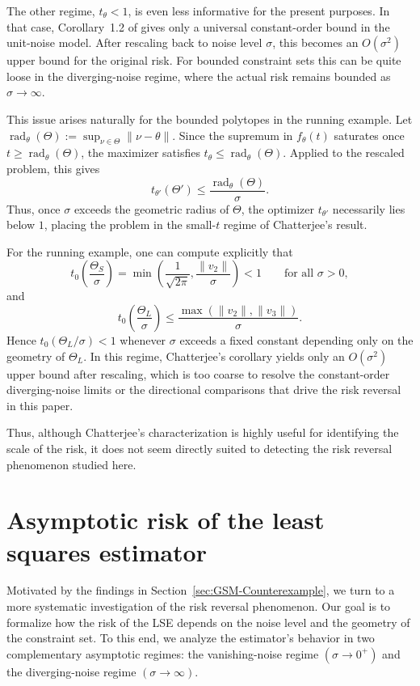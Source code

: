 \documentclass[11pt]{article}
\theoremstyle{plain}
\theoremstyle{definition}
\begin{document}
The other regime, $t_\theta<1$, is even less informative for the present purposes. In that case, Corollary~1.2 of \cite{Chatterjee14} gives only a
universal constant-order bound in the unit-noise model. After rescaling back to
noise level $\sigma$, this becomes an $O(\sigma^2)$ upper bound for the
original risk. For bounded constraint sets this can be quite loose in the
diverging-noise regime, where the actual risk remains bounded as
$\sigma\to\infty$.

This issue arises naturally for the bounded polytopes in
the running example. Let
$\operatorname{rad}_\theta(\Theta):=
\sup_{\nu\in\Theta}\|\nu-\theta\|$. Since the supremum in $f_\theta(t)$
saturates once $t\ge \operatorname{rad}_\theta(\Theta)$, the maximizer
satisfies $t_\theta\le \operatorname{rad}_\theta(\Theta)$. Applied to the
rescaled problem, this gives
\[
    t_{\theta'}(\Theta')
    \le
    \frac{\operatorname{rad}_\theta(\Theta)}{\sigma}.
\]
Thus, once $\sigma$ exceeds the geometric radius of $\Theta$, the optimizer
$t_{\theta'}$ necessarily lies below $1$, placing the problem in the
small-$t$ regime of Chatterjee's result.

For the running example, one can compute explicitly that
\[
    t_0\!\left(\frac{\Theta_S}{\sigma}\right)
    =
    \min\left(
        \frac{1}{\sqrt{2\pi}},
        \frac{\|v_2\|}{\sigma}
    \right)
    <1
    \qquad
    \text{for all }\sigma>0,
\]
and
\[
    t_0\!\left(\frac{\Theta_L}{\sigma}\right)
    \le
    \frac{\max(\|v_2\|,\|v_3\|)}{\sigma}.
\]
Hence $t_0(\Theta_L/\sigma)<1$ whenever $\sigma$ exceeds a fixed constant
depending only on the geometry of $\Theta_L$. In this regime, Chatterjee's
corollary yields only an $O(\sigma^2)$ upper bound after rescaling, which is
too coarse to resolve the constant-order diverging-noise limits or the
directional comparisons that drive the risk reversal in this paper.

Thus, although Chatterjee's characterization is highly useful for identifying
the scale of the risk, it does not seem directly suited to detecting the risk
reversal phenomenon studied here.




\section{Asymptotic risk of the least squares estimator} \label{sec:asymptotic-analysis}
Motivated by the findings in Section~\ref{sec:GSM-Counterexample}, we turn to a more systematic investigation of the risk reversal phenomenon. Our goal is to formalize how the risk of the LSE depends on the noise level and the geometry of the constraint set. To this end, we analyze the estimator's behavior in two complementary asymptotic regimes: the vanishing-noise regime $(\sigma \to 0^+)$ and the diverging-noise regime $(\sigma \to \infty)$.
\end{document}
